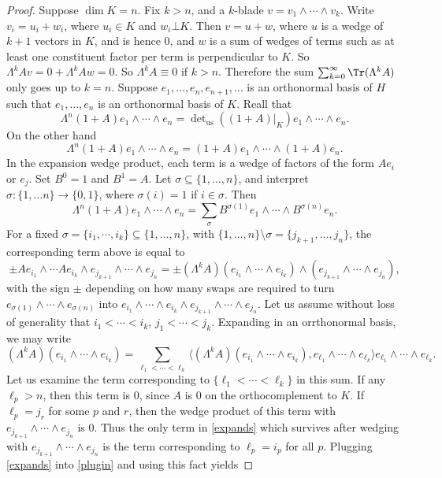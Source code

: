 \documentclass[12pt]{amsart}
\begin{document}
\begin{proof}
Suppose $\dim K = n$. Fix $k > n$, and a $k$-blade $v = v_1\wedge \cdots \wedge v_k$. Write $v_i = u_i + w_i$, where $u_i \in K$ and $w_i \bot K$. Then $v = u + w$, where $u$ is a wedge of $k+1$ vectors in $K$, and is hence $0$, and $w$ is a sum of wedges of terms such as at least one constituent factor per term is perpendicular to $K$. So $\Lambda^kAv = 0 + \Lambda^k Aw = 0$. So $\Lambda^k A \equiv 0$ if $k > n$. Therefore the sum $\sum_{k=0}^\infty \Tr(\Lambda^k A)$ only goes up to $k = n$. Suppose $e_1,\ldots,e_n,e_{n+1},\ldots$ is an orthonormal basis of $H$ such that $e_1,\ldots,e_n$ is an orthonormal basis of $K$. Reall that
\[\Lambda^n (1+A)e_1\wedge \cdots \wedge e_n = \det\nolimits_{\mathrm{us}}((1+A)|_K)e_1\wedge \cdots \wedge e_n.\]
On the other hand
\[\Lambda^n (1+A)e_1\wedge \cdots \wedge e_n = (1+A)e_1 \wedge \cdots \wedge (1+A)e_n.\] In the expansion wedge product, each term is a wedge of factors of the form $Ae_i$ or $e_j$. Set $B^0 = 1$ and $B^1 = A$. Let $\sigma \subseteq \{1,\ldots, n\}$, and interpret $\sigma:\{1,\ldots n\} \to \{0,1\}$, where $\sigma(i) = 1$ if $i \in \sigma$. Then
\[\Lambda^n (1+A)e_1\wedge \cdots \wedge e_n = \sum_{\sigma} B^{\sigma(1)}e_1 \wedge \cdots \wedge B^{\sigma(n)} e_n.\]
For a fixed $\sigma = \{i_1,\cdots, i_k\} \subseteq \{1,\ldots, n\}$, with $\{1,\ldots, n\}\setminus \sigma = \{j_{k+1},\ldots, j_n\}$, the corresponding term above is equal to
\begin{equation}\label{plugin}\pm Ae_{i_1}\wedge \cdots Ae_{i_k}\wedge e_{j_{k+1}}\wedge \cdots\wedge e_{ j_n} = \pm(\Lambda^k A)(e_{i_1}\wedge \cdots \wedge e_{i_k})\wedge(e_{j_{k+1}}\wedge \cdots\wedge e_{j_n}),\end{equation}
with the sign $\pm$ depending on how many swaps are required to turn $e_{\sigma(1)}\wedge \cdots \wedge e_{\sigma(n)}$ into $e_{i_1}\wedge \cdots \wedge e_{i_k} \wedge e_{j_{k+1}} \wedge \cdots \wedge e_{j_n}$.
Let us assume without loss of generality that $i_1 < \cdots < i_k$, $j_1 < \cdots < j_k$. Expanding in an orrthonormal basis, we may write
\begin{equation}\label{expands}(\Lambda^k A)(e_{i_1}\wedge \cdots \wedge e_{i_k}) = \sum_{\ell_1 < \cdots < \ell_k} \langle (\Lambda^k A)(e_{i_1}\wedge \cdots \wedge e_{i_k}), e_{\ell_{1}}\wedge\cdots\wedge e_{\ell_k}\rangle e_{\ell_{1}}\wedge\cdots\wedge e_{\ell_k}.\end{equation} Let us examine the term corresponding to $\{\ell_1 < \cdots < \ell_k\}$ in this sum. If any $\ell_p > n$, then this term is $0$, since $A$ is $0$ on the orthocomplement to $K$. If $\ell_p = j_r$ for some $p$ and $r$, then the wedge product of this term with $e_{j_{k+1}}\wedge \cdots\wedge e_{ j_n}$ is $0$. Thus the only term in \eqref{expands} which survives after wedging with $e_{j_{k+1}}\wedge \cdots\wedge e_{ j_n}$ is the term corresponding to $\ell_p = i_p$ for all $p$. Plugging \eqref{expands} into \eqref{plugin} and using this fact yields

\end{proof}
\end{document}
